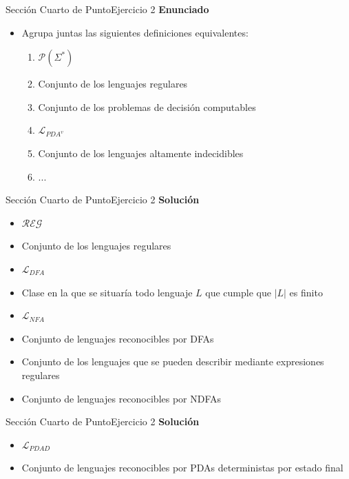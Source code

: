 \documentclass[10pt, envcountsect, presentation, aspectratio=169]{beamer}
\newcommand{\ldfa}{\ensuremath{\mathcal L_{DFA}}}
\newcommand{\lnfa}{\ensuremath{\mathcal L_{NFA}}}
\newcommand{\lreg}{\ensuremath{\mathcal {REG}}}
\newcommand{\lpdav}{\ensuremath{\mathcal L_{PDA^v}}}
\newcommand{\lpdad}{\ensuremath{\mathcal L_{PDAD}}}
\begin{document}
\begin{frame}{Sección Cuarto de Punto}{Ejercicio 2}
\textbf{Enunciado}
	\begin{itemize}
        \item Agrupa juntas las siguientes definiciones equivalentes:
        \begin{enumerate}[1.]
            \item $\mathcal{P}( \Sigma ^ *)$
            \item Conjunto de los lenguajes regulares
            \item Conjunto de los problemas de decisión computables
            \item $\lpdav$
            \item Conjunto de los lenguajes altamente indecidibles
            \item ...
        \end{enumerate}
	\end{itemize}
\end{frame}


\begin{frame}{Sección Cuarto de Punto}{Ejercicio 2}
    \textbf{Solución}\\
    \begin{itemize}
        \item $\lreg$
        \item[2.] Conjunto de los lenguajes regulares
        \item[15.] $\ldfa$
        \item[16.] Clase en la que se situaría todo lenguaje $L$ que cumple que $|L|$ es finito
        \item[20.] $\lnfa$
        \item[21.] Conjunto de lenguajes reconocibles por DFAs
        \item[22.] Conjunto de los lenguajes que se pueden describir mediante expresiones regulares
        \item[24.] Conjunto de lenguajes reconocibles por NDFAs
    \end{itemize}
\end{frame}


\begin{frame}{Sección Cuarto de Punto}{Ejercicio 2}
    \textbf{Solución}\\
    \begin{itemize}
        \item $\lpdad$
        \item[19.] Conjunto de lenguajes reconocibles por PDAs deterministas por estado final
    \end{itemize}
\end{frame}
\end{document}
